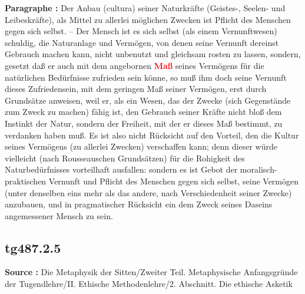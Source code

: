 \documentclass[a4paper,12pt,twoside]{book}
\newcommand{\match}[1]{\textcolor{red}{\textbf{#1}}}
\begin{document}
	\textbf{Paragraphe : }Der Anbau (cultura) seiner Naturkräfte (Geistes-, Seelen- und Leibeskräfte), als Mittel zu allerlei möglichen Zwecken ist Pflicht des Menschen gegen sich selbst. – Der Mensch ist es sich selbst (als einem Vernunftwesen) schuldig, die Naturanlage und Vermögen, von denen seine Vernunft dereinst Gebrauch machen kann, nicht unbenutzt und gleichsam rosten zu lassen, sondern, gesetzt daß er auch mit dem angebornen \match{Maß} seines Vermögens für die natürlichen Bedürfnisse zufrieden sein könne, so muß ihm doch seine Vernunft dieses Zufriedensein, mit dem geringen Maß seiner Vermögen, erst durch Grundsätze anweisen, weil er, als ein Wesen, das der Zwecke (sich Gegenstände zum Zweck zu machen) fähig ist, den Gebrauch seiner Kräfte nicht bloß dem Instinkt der Natur, sondern der Freiheit, mit der er dieses Maß bestimmt, zu verdanken haben muß. Es ist also nicht Rücksicht auf den Vorteil, den die Kultur seines Vermögens (zu allerlei Zwecken) verschaffen kann; denn dieser würde vielleicht (nach Rousseauschen Grundsätzen) für die Rohigkeit des Naturbedürfnisses vorteilhaft ausfallen: sondern es ist Gebot der moralisch-praktischen Vernunft und Pflicht des Menschen gegen sich selbst, seine  Vermögen (unter denselben eins mehr als das andere, nach Verschiedenheit seiner Zwecke) anzubauen, und in pragmatischer Rücksicht ein dem Zweck seines Daseins angemessener Mensch zu sein. 
	
	\subsection*{tg487.2.5} 
	\textbf{Source : }Die Metaphysik der Sitten/Zweiter Teil. Metaphysische Anfangsgründe der Tugendlehre/II. Ethische Methodenlehre/2. Abschnitt. Die ethische Asketik\\  
	
\end{document}
